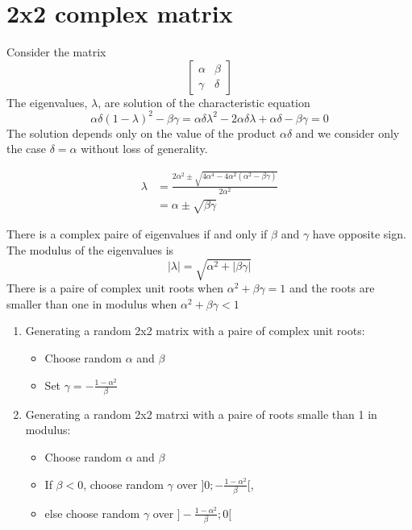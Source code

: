 \documentclass{article}
\begin{document}
\section{2x2 complex matrix}
Consider the matrix
\[
  \left[
    \begin{array}{cc}
      \alpha & \beta\\
      \gamma & \delta
    \end{array}
  \right]
\]
The eigenvalues, $\lambda$, are solution of the characteristic equation
\[
  \alpha\delta(1-\lambda)^2 - \beta\gamma = \alpha\delta\lambda^2
  -2\alpha\delta\lambda + \alpha\delta - \beta\gamma = 0
\]
The solution depends only on the value of the product $\alpha\delta$
and we consider only the case $\delta=\alpha$ without loss of
generality.

\begin{align*}
  \lambda &= \frac{2\alpha^2 \pm \sqrt{4\alpha^4 -
            4\alpha^2(\alpha^2 - \beta\gamma)}}{2\alpha^2}\\
  &  = \alpha \pm \sqrt{\beta\gamma}  
\end{align*}

There is a complex paire of eigenvalues if and only if $\beta$ and
$\gamma$ have opposite sign. The modulus of the eigenvalues is
\[
  |\lambda| = \sqrt{\alpha^2 + |\beta\gamma|}
\]
There is a paire of complex unit roots when $\alpha^2 + \beta\gamma =
1$ and the roots are smaller than one in modulus when $\alpha^2 + \beta\gamma <
1$
\begin{enumerate}
\item Generating a random 2x2 matrix with a paire of complex unit
  roots:
  \begin{itemize}
  \item Choose random $\alpha$ and $\beta$
  \item Set $\gamma = -\frac{1 - \alpha^2}{\beta}$
  \end{itemize}
\item Generating a random 2x2 matrxi with a paire of roots smalle than
  1 in modulus:
  \begin{itemize}
  \item Choose random $\alpha$ and $\beta$
  \item If $\beta < 0$, choose random $\gamma$ over $]0; -\frac{1 -
      \alpha^2}{\beta}[$,
  \item else choose random $\gamma$ over $]-\frac{1 -
      \alpha^2}{\beta}; 0[$
  \end{itemize}
\end{enumerate}
\end{document}

